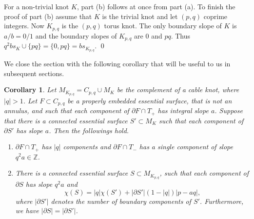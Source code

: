 \documentclass[11pt]{amsart}
\newtheorem{corollary}[theorem]{Corollary}
\theoremstyle{definition}
\newcommand{\ZZ}{{\mathbb{Z}}}
\newcommand{\M}{M_{K_{p,q}}}
\newcommand{\C}{{C_{p, q}}}
\newcommand{\K}{{K_{p, q}}}
\newcommand{\abs}[1]{{\left\vert #1 \right\vert}}
\begin{document}
For a non-trivial knot $K$, part (b) follows at once from part (a).
To finish the proof of part (b) assume that $K$ is the trivial knot and let  $(p, q)$ coprime  integers.
Now $\K$ is the $(p, q)$ torus knot. The only boundary slope of $K$ is  $a/b=0/1$ and the boundary slopes of
$\K$ are $0$ and $pq$. Thus $q^2 bs_K \cup \{pq\} =\{0, pq \}= bs_{K_{p,q}}$. \qed
\medskip

We close the section with the following corollary that will be useful to us in subsequent sections.

\begin{corollary}\label{integers} Let $\M=\C\cup M_K$ be the complement of a cable knot, where $\abs{q}>1$.
Let $F\subset \C$ be a properly embedded essential surface, that is not an annulus, and such that each   component of 
 $\partial F\cap T_{+}$  has integral slope $a$. 
Suppose   that there is a connected essential surface
$S'\subset M_K$ such that each component of $\partial S'$ has slope $a$. Then the followings hold.
\begin{enumerate}
\item 
 $\partial F\cap T_{+}$  has $\abs{q}$ components and  $\partial F\cap T_{-}$ has a single component
 of slope $q^2a\in \ZZ$.

\item There is a connected essential surface $S\subset \M$, such that each component of $\partial S$ has slope
$q^2a$ and 
$$\chi(S)=    \abs{q} \chi(S') + \abs{ \partial S'}(1-\abs{q})\abs{p-aq},$$
\noindent where $\abs{ \partial S'}$ denotes the number of boundary components of $S'$.
Furthermore, we have $\abs{ \partial S}= \abs{ \partial S'}$.

\end{enumerate}

\end{corollary}
\end{document}
